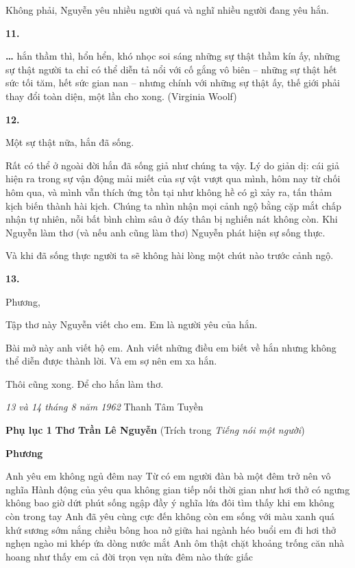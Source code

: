 \documentclass[../main.tex]{subfiles}
\begin{document}
\begin{multicols}{2}
\begin{blockquote}
\end{blockquote}
 
Không phải, Nguyễn yêu nhiều người quá và nghĩ nhiều người đang yêu hắn. 
 
 
\textbf{11.} 
 
\textbf{… }hắn thầm thì, hổn hển, khó nhọc soi sáng những sự thật thầm kín ấy, những sự thật người ta chỉ có thể diễn tả nổi với cố gắng vô biên – những sự thật hết sức tối tăm, hết sức gian nan – nhưng chính với những sự thật ấy, thế giới phải thay đổi toàn diện, một lần cho xong. (Virginia Woolf)        
 
 
 
\textbf{12.} 
 
Một sự thật nữa, hắn đã sống. 
 
Rất có thể ở ngoài đời hắn đã sống giả như chúng ta vậy. Lý do giản dị: cái giả hiện ra trong sự vận động mải miết của sự vật vượt qua mình, hôm nay từ chối hôm qua, và mình vẫn thích ứng tồn tại như không hề có gì xảy ra, tấn thảm kịch biến thành hài kịch. Chúng ta nhìn nhận mọi cảnh ngộ bằng cặp mắt chấp nhận tự nhiên, nỗi bất bình chìm sâu ở đáy thân bị nghiến nát không còn. Khi Nguyễn làm thơ (và nếu anh cũng làm thơ) Nguyễn phát hiện sự sống thực. 
 
Và khi đã sống thực người ta sẽ không hài lòng một chút nào trước cảnh ngộ.        
        
 
\textbf{13.} 
 
Phương,  
 
Tập thơ này Nguyễn viết cho em. Em là người yêu của hắn. 
 
Bài mở này anh viết hộ em. Anh viết những điều em biết về hắn nhưng không thể diễn được thành lời. Và em sợ nên em xa hắn. 
 
Thôi cũng xong. Để cho hắn làm thơ. 
 
\textit{13 và 14 tháng 8 năm 1962} 
Thanh Tâm Tuyền        
        
 
 
\textbf{Phụ lục 1} 
\textbf{Thơ Trần Lê Nguyễn } 
(Trích trong \textit{Tiếng nói một người})        
 
\textbf{Phương} 
 
Anh yêu em không ngủ đêm nay 
Từ có em 
người đàn bà một đêm trở nên vô nghĩa 
Hành động của yêu 
qua không gian tiếp nối thời gian 
như hơi thở có ngưng không bao giờ dứt 
phút sống ngập đầy 
ý nghĩa lứa đôi tìm thấy 
khi em không còn trong tay 
Anh đã yêu cùng cực 
đến không còn em 
sống với màu xanh quá khứ 
sương sớm nắng chiều 
bông hoa nở giữa hai ngành héo buổi em đi 
hơi thở nghẹn ngào 
mi khép ứa dòng nước mắt 
Anh ôm thật chặt khoảng trống căn nhà hoang 
như thấy em cả đời trọn vẹn 
nửa đêm nào thức giấc 
 

\end{multicols}
\end{document}
